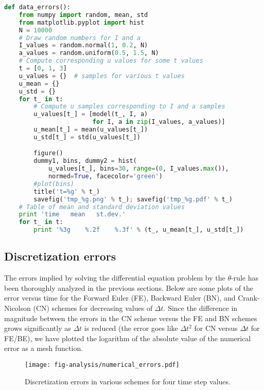 \documentclass[graybox,sectrefs,envcountresetchap,open=right,final]{svmonodo}
\begin{document}
\begin{lstlisting}[language=python,style=blue1_bluegreen]
def data_errors():
    from numpy import random, mean, std
    from matplotlib.pyplot import hist
    N = 10000
    # Draw random numbers for I and a
    I_values = random.normal(1, 0.2, N)
    a_values = random.uniform(0.5, 1.5, N)
    # Compute corresponding u values for some t values
    t = [0, 1, 3]
    u_values = {}  # samples for various t values
    u_mean = {}
    u_std = {}
    for t_ in t:
        # Compute u samples corresponding to I and a samples
        u_values[t_] = [model(t_, I, a)
                        for I, a in zip(I_values, a_values)]
        u_mean[t_] = mean(u_values[t_])
        u_std[t_] = std(u_values[t_])

        figure()
        dummy1, bins, dummy2 = hist(
            u_values[t_], bins=30, range=(0, I_values.max()),
            normed=True, facecolor='green')
        #plot(bins)
        title('t=%g' % t_)
        savefig('tmp_%g.png' % t_); savefig('tmp_%g.pdf' % t_)
    # Table of mean and standard deviation values
    print 'time   mean   st.dev.'
    for t_ in t:
        print '%3g    %.2f    %.3f' % (t_, u_mean[t_], u_std[t_])

\end{lstlisting}


\subsection{Discretization errors}

The errors implied by solving the differential equation problem by
the $\theta$-rule has been thoroughly analyzed in the previous
sections. Below are some plots of the error versus time for the
Forward Euler (FE), Backward Euler (BN), and Crank-Nicolson (CN)
schemes for decreasing values of $\Delta t$. Since the difference
in magnitude between the errors in the CN scheme versus the FE and
BN schemes grows significantly as $\Delta t$ is reduced (the error
goes like $\Delta t^2$ for CN versus $\Delta t$ for FE/BE), we have
plotted the logarithm of the absolute value of the numerical error
as a mesh function.

\begin{figure}[!ht]  %
  \centerline{\texttt{[image: fig-analysis/numerical\_errors.pdf]}}
  \caption{
  Discretization errors in various schemes for four time step values. \label{decay:analysis:numerical_errors:fig}
  }
\end{figure}
\end{document}
